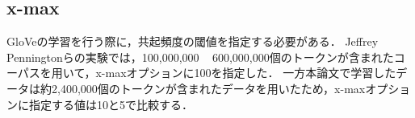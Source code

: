 \subsection{x-max}
GloVeの学習を行う際に，共起頻度の閾値を指定する必要がある．
Jeffrey Penningtonらの実験では，100,000,000 ~ 600,000,000個のトークンが含まれたコーパスを用いて，x-maxオプションに100を指定した．
一方本論文で学習したデータは約2,400,000個のトークンが含まれたデータを用いたため，x-maxオプションに指定する値は10と5で比較する．



